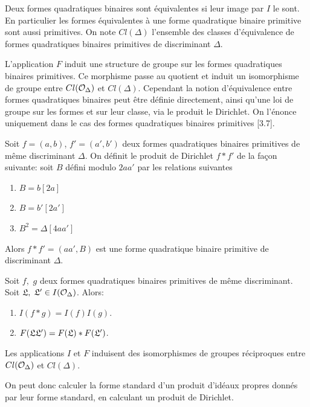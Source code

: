 \begin{Def}
	Deux formes quadratiques binaires sont équivalentes si leur image par $I$ le sont. En particulier les formes équivalentes à une forme quadratique binaire primitive sont aussi primitives. On note $Cl(\Delta)$ l'ensemble des classes d'équivalence de formes quadratiques binaires primitives de discriminant $\Delta$.
\end{Def}

L'application $F$ induit une structure de groupe sur les formes quadratiques binaires primitives. Ce morphisme passe au quotient et induit un isomorphisme de groupe entre $Cl(\mathcal{O}_{\Delta})$ et $Cl(\Delta)$. Cependant la notion d'équivalence entre formes quadratiques binaires peut être définie directement, ainsi qu'une loi de groupe sur les formes et sur leur classe, via le produit le Dirichlet. On l'énonce uniquement dans le cas des formes quadratiques binaires primitives \cite{Cox}[3.7]. 

\begin{Def}
	Soit $f = (a,b)$, $f' = (a', b')$ deux formes quadratiques binaires primitives de même discriminant $\Delta$. On définit le produit de Dirichlet $f*f'$ de la façon suivante: soit $B$ défini modulo $2aa'$ par les relations suivantes
	\begin{enumerate}
		\item $B = b [2a]$
		\item $B = b' [2a']$
		\item $B^2 = \Delta [4aa']$
	\end{enumerate}
	Alors $f*f' = (aa', B)$ est une forme quadratique binaire primitive de discriminant $\Delta$.
\end{Def}

\begin{Prop}
	
	Soit $f,$ $g$ deux formes quadratiques binaires primitives de même discriminant. Soit $\mathfrak{L},$ $\mathfrak{L}'\in I(\mathcal{O}_{\Delta})$. Alors:
	\begin{enumerate}
		\item $I(f*g) = I(f)I(g)$.
		\item $F(\mathfrak{L}\mathfrak{L}') = F(\mathfrak{L})*F(\mathfrak{L}')$.
	\end{enumerate} 
	Les applications $I$ et $F$ induisent des isomorphismes de groupes réciproques entre $Cl(\mathcal{O}_{\Delta})$ et $Cl(\Delta)$.
\end{Prop}

\begin{Rem}
	On peut donc calculer la forme standard d'un produit d'idéaux propres donnés par leur forme standard, en calculant un produit de Dirichlet.
\end{Rem}

